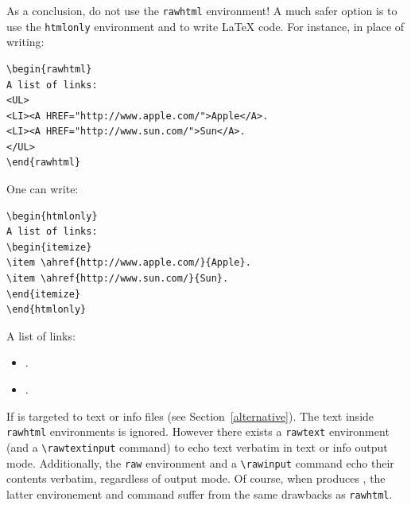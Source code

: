 As a conclusion, do not use the \texttt{rawhtml} environment!
A much safer option is to use the \texttt{htmlonly} environment
and to write \LaTeX{} code.
For instance, in place of writing:
\begin{verbatim}
\begin{rawhtml}
A list of links:
<UL>
<LI><A HREF="http://www.apple.com/">Apple</A>.
<LI><A HREF="http://www.sun.com/">Sun</A>.
</UL>
\end{rawhtml}
\end{verbatim}
One can write:
\begin{verbatim}
\begin{htmlonly}
A list of links:
\begin{itemize}
\item \ahref{http://www.apple.com/}{Apple}.
\item \ahref{http://www.sun.com/}{Sun}.
\end{itemize}
\end{htmlonly}
\end{verbatim}
\begin{htmlonly}
A list of links:
\begin{itemize}
\item {}.
\item {}.
\end{itemize}
\end{htmlonly}


If \hevea{} is targeted to text or info files (see
Section~\ref{alternative}).
The text inside \texttt{rawhtml} environments is ignored.
However there exists a \texttt{rawtext} environment (and a
\verb+\rawtextinput+ command) to echo text verbatim in text or info
output mode.
Additionally, the \texttt{raw} environment and a \verb+\rawinput+
command echo their contents verbatim, regardless of \hevea{} output
mode. Of course, when \hevea{} produces \html{},
the latter environement and command suffer from
the same drawbacks as \texttt{rawhtml}.


